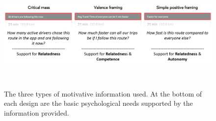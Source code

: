 \begin{figure}[t]
\centering
  \includegraphics[scale=0.6]{figures/s3-motivative.png}
  \caption{The three types of motivative information used. At the bottom of each design are the basic psychological needs supported by the information provided.}~\label{fig:s3-motivative}
\end{figure}


